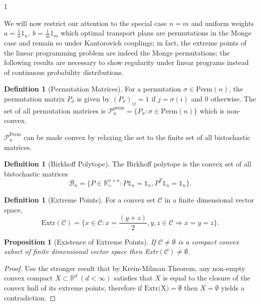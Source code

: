 \documentclass[12pt]{article}
\newtheorem{proposition}[theorem]{Proposition}
\theoremstyle{definition}
\newtheorem{definition}[theorem]{Definition}
\theoremstyle{plain}
\begin{document}
\begin{spacing}{1}
{We will now restrict our attention to the special case $n = m$ and uniform weights $a = \frac{1}{n} 1_n, \ b = \frac{1}{m} 1_m$ which optimal transport plans are permutations in the Monge case and remain so under Kantorovich couplings; in fact, the extreme points of the linear programming problem are indeed the Monge permutations; the following results are necessary to show regularity under linear programs instead of continuous probability distributions.

\begin{definition}[Permutation Matrices]
    For a permutation $\sigma \in \text{Perm}(n)$, the permutation matrix $P_\sigma$ is given by $(P_\sigma)_{ij} = 1$ if $j = \sigma(i)$ and 0 otherwise. The set of all permutation matrices is $\mathcal{P}^\text{perm}_n = \{P_\sigma: \sigma \in \text{Perm}(n)\}$ which is non-convex.
\end{definition}

$\mathcal{P}^\text{Perm}_n$ can be made convex by relaxing the set to the finite set of all bistochastic matrices.

\newpage
\begin{definition}[Birkhoff Polytope]
    The Birkhoff polytope is the convex set of all bistochastic matrices \[
    \mathcal{B}_n = \{P \in \mathbb{R}^{n \times n}_+: P \mathds{1}_n = \mathds{1}_n, P^T \mathds{1}_n = \mathds{1}_n  \}.
    \]
\end{definition}

\begin{definition}[Extreme Points]
    For a convex set $\mathcal{C}$ in a finite dimensional vector space, 
    \[
    \text{Extr}(\mathcal{C}) = \{x \in \mathcal{C}: x = \frac{(y + z)}{2}, y, z \in \mathcal{C} \Rightarrow x = y = z\}.
    \]
\end{definition}

\begin{proposition}[Existence of Extreme Points]
    If $\mathcal{C} \neq \emptyset$ is a compact convex subset of finite dimensional vector space then Extr$(\mathcal{C}) \neq \emptyset$.
\end{proposition}

\begin{proof}
    Use the stronger result that by Krein-Milman Theorem, any non-empty convex compact $X \subset \mathbb{R}^d \ (d < \infty)$ satisfies that $X$ is equal to the closure of the convex hull of its extreme points; therefore if $\text{Extr(X)} = \emptyset$ then $X = \emptyset$ yields a contradiction.
\end{proof}

}
\end{spacing}
\end{document}
